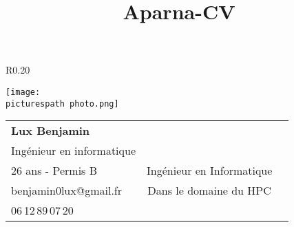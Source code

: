 \documentclass[letterpaper,11pt]{article}
\title{Aparna-CV}
\newcommand\picturespath{ressources/pictures/}
\begin{document}
\begin{wrapfigure}{R}{0.20\textwidth}
  \vspace{-65pt}
  \begin{center}
    \texttt{[image: \\picturespath photo.png]}
  \end{center}
  \vspace{-10pt}
  \vspace{-100pt}
\end{wrapfigure}

\begin{tabular*}{7in}{l c r}
  \textbf{\Large Lux Benjamin}  \\
  Ingénieur en informatique  \\
  26 ans - Permis B          & \LARGE{Ingénieur en Informatique}\\
  benjamin0lux@gmail.fr      & Dans le domaine du HPC\\ 
  06\,12\,89\,07\,20       %

\end{tabular*}
\end{document}
